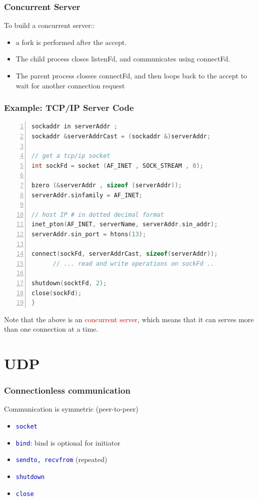 \documentclass[12pt]{beamer}
\begin{document}
\begin{frame}
	\frametitle{Concurrent Server}
	{\footnotesize To build a concurrent server::
	\begin{itemize}
		\item a fork is performed after the accept.
		\item The child process closes listenFd, and communicates using connectFd. 
		\item The parent process closses connectFd, and then loops back to the accept to wait for another connection request
	\end{itemize}
	}
\end{frame}

\begin{frame}[fragile]
	\frametitle{Example: TCP/IP Server Code}	
	{\tiny
	\begin{lstlisting}[language=C, breaklines=true, commentstyle=\color{mygreen},frame=lrtb,  rulecolor=\color{black}, numbers=left,  numbersep=5pt, numberstyle=\tiny\color{mygray}]
sockaddr in serverAddr ;
sockaddr &serverAddrCast = (sockaddr &)serverAddr;

// get a tcp/ip socket
int sockFd = socket (AF_INET , SOCK_STREAM , 0);

bzero (&serverAddr , sizeof (serverAddr));
serverAddr.sinfamily = AF_INET;

// host IP # in dotted decimal format
inet_pton(AF_INET, serverName, serverAddr.sin_addr);
serverAddr.sin_port = htons(13);

connect(sockFd, serverAddrCast, sizeof(serverAddr));
      // ... read and write operations on sockFd ..
     
shutdown(socktFd, 2);
close(sockFd);
}
	\end{lstlisting}}
	{\footnotesize
	Note that the above is an \textcolor{red}{concurrent server}, which means that it can serves more than one connection at a time.
	}
\end{frame}	

\section{UDP}
\begin{frame}
	\frametitle{Connectionless communication}
	{\footnotesize Communication is symmetric (peer-to-peer)
	\begin{itemize}
		\item \texttt{\textcolor{blue}{socket}}
		\item \texttt{\textcolor{blue}{bind}}: bind is optional for initiator
		\item \texttt{\textcolor{blue}{sendto, recvfrom}} (repeated)
		\item \texttt{\textcolor{blue}{shutdown}}
		\item \texttt{\textcolor{blue}{close}}								
	\end{itemize}
	}
\end{frame}
\end{document}

